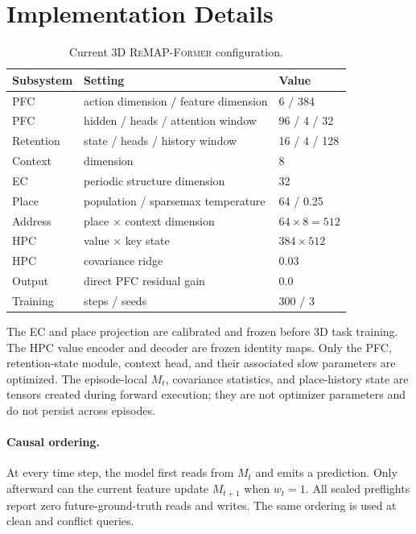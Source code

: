 \documentclass{article}
\newcommand{\model}{\textsc{ReMAP-Former}}
\newcommand{\hpc}{\textsc{HPC}}
\newcommand{\ec}{\textsc{EC}}
\newcommand{\pfc}{\textsc{PFC}}
\begin{document}
\appendix

\section{Implementation Details}

\begin{table}[h]
\centering
\caption{Current 3D \model{} configuration.}
\label{tab:config}
\small
\begin{tabular}{lll}
\toprule
Subsystem & Setting & Value\\
\midrule
\pfc{} & action dimension / feature dimension & 6 / 384\\
\pfc{} & hidden / heads / attention window & 96 / 4 / 32\\
Retention & state / heads / history window & 16 / 4 / 128\\
Context & dimension & 8\\
\ec{} & periodic structure dimension & 32\\
Place & population / sparsemax temperature & 64 / 0.25\\
Address & place $\times$ context dimension & $64\times8=512$\\
\hpc{} & value $\times$ key state & $384\times512$\\
\hpc{} & covariance ridge & 0.03\\
Output & direct \pfc{} residual gain & 0.0\\
Training & steps / seeds & 300 / 3\\
\bottomrule
\end{tabular}
\end{table}

The \ec{} and place projection are calibrated and frozen before 3D task training.
The \hpc{} value encoder and decoder are frozen identity maps.
Only the \pfc, retention-state module, context head, and their associated slow parameters are optimized.
The episode-local $M_t$, covariance statistics, and place-history state are tensors created during forward execution; they are not optimizer parameters and do not persist across episodes.

\paragraph{Causal ordering.}
At every time step, the model first reads from $M_t$ and emits a prediction.
Only afterward can the current feature update $M_{t+1}$ when $w_t=1$.
All sealed preflights report zero future-ground-truth reads and writes.
The same ordering is used at clean and conflict queries.
\end{document}
